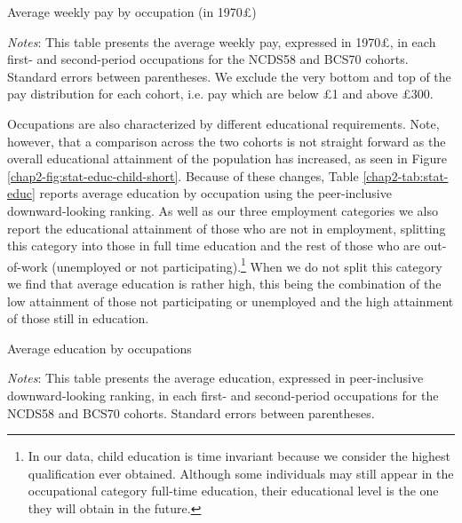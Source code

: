 \begin{table}[!htb]
    \centering
    \caption{Average weekly pay by occupation (in 1970£)}
    \label{chap2-tab:stat-pay}
    \begin{threeparttable}
        \setlength{\tabcolsep}{18pt}
        
        \begin{tablenotes}[flushleft]
            \footnotesize{\item \textit{Notes}: This table presents the average weekly pay, expressed in 1970£, in each first- and second-period occupations for the NCDS58 and BCS70 cohorts. Standard errors between parentheses. We exclude the very bottom and top of the pay distribution for each cohort, i.e. pay which are below £1 and above £300.}
        \end{tablenotes}
    \end{threeparttable}
\end{table}

Occupations are also characterized by different educational requirements. Note, however, that a comparison across the two cohorts is not straight forward as the overall educational attainment of the population has increased, as seen in Figure \ref{chap2-fig:stat-educ-child-short}. Because of these changes, Table \ref{chap2-tab:stat-educ} reports average education by occupation using the peer-inclusive downward-looking ranking. As well as our three employment categories we also report the educational attainment of those who are not in employment, splitting this category into those in full time education and the rest of those who are out-of-work (unemployed or not participating).\footnote{In our data, child education is time invariant because we consider the highest qualification ever obtained. Although some individuals may still appear in the occupational category full-time education, their educational level is the one they will obtain in the future.} When we do not split this category we find that average education is rather high, this being the combination of the low attainment of those not participating or unemployed and the high attainment of those still in education.

\begin{table}[!htb]
    \centering
    \caption{Average education by occupations}
    \label{chap2-tab:stat-educ}
    \begin{threeparttable}
        \setlength{\tabcolsep}{18pt}
        
        \begin{tablenotes}[flushleft]
            \footnotesize{\item \textit{Notes}: This table presents the average education, expressed in peer-inclusive downward-looking ranking, in each first- and second-period occupations for the NCDS58 and BCS70 cohorts. Standard errors between parentheses.}
        \end{tablenotes}
    \end{threeparttable}
\end{table}

